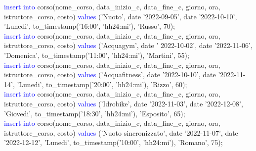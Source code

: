 \documentclass{article}
\begin{document}
\begin{flushleft}
{        \vspace{2mm}
        \hspace*{0.5em}\textcolor{blue}{insert into} corso(nome\_corso, data\_inizio\_c, data\_fine\_c, giorno, ora, \hspace*{0.0em} istruttore\_corso, costo) \textcolor{blue}{values} ('Nuoto', date '2022-09-05', date '2022-10-10', \hspace*{0.4em}'Lunedi', to\_timestamp('16:00', 'hh24:mi'), 'Russo', 70); \\
        \vspace{2mm}
        \hspace*{0.5em}\textcolor{blue}{insert into} corso(nome\_corso, data\_inizio\_c, data\_fine\_c, giorno, ora, \hspace*{0.0em} istruttore\_corso, costo) \textcolor{blue}{values} ('Acquagym', date ' 2022-10-02', date \hspace*{0.4em}'2022-11-06', 'Domenica', to\_timestamp('11:00', 'hh24:mi'), 'Martini', 55); \\
        \vspace{2mm}
        \hspace*{0.5em}\textcolor{blue}{insert into} corso(nome\_corso, data\_inizio\_c, data\_fine\_c, giorno, ora, \hspace*{0.0em} istruttore\_corso, costo) \textcolor{blue}{values} ('Acquafitness', date '2022-10-10', date \hspace*{0.4em}'2022-11-14', 'Lunedi', to\_timestamp('20:00', 'hh24:mi'), 'Rizzo', 60); \\
        \vspace{2mm}
        \hspace*{0.5em}\textcolor{blue}{insert into} corso(nome\_corso, data\_inizio\_c, data\_fine\_c, giorno, ora, \hspace*{0.0em} istruttore\_corso, costo) \textcolor{blue}{values} ('Idrobike', date '2022-11-03', date \hspace*{0.4em}'2022-12-08', 'Giovedi', to\_timestamp('18:30', 'hh24:mi'), 'Esposito', 65); \\
        \vspace{2mm}
        \hspace*{0.5em}\textcolor{blue}{insert into} corso(nome\_corso, data\_inizio\_c, data\_fine\_c, giorno, ora, \hspace*{0.0em} istruttore\_corso, costo) \textcolor{blue}{values} ('Nuoto sincronizzato', date '2022-11-07', date \hspace*{0.4em}'2022-12-12', 'Lunedi', to\_timestamp('10:00', 'hh24:mi'), 'Romano', 75); \\
}
\end{flushleft}
\end{document}
